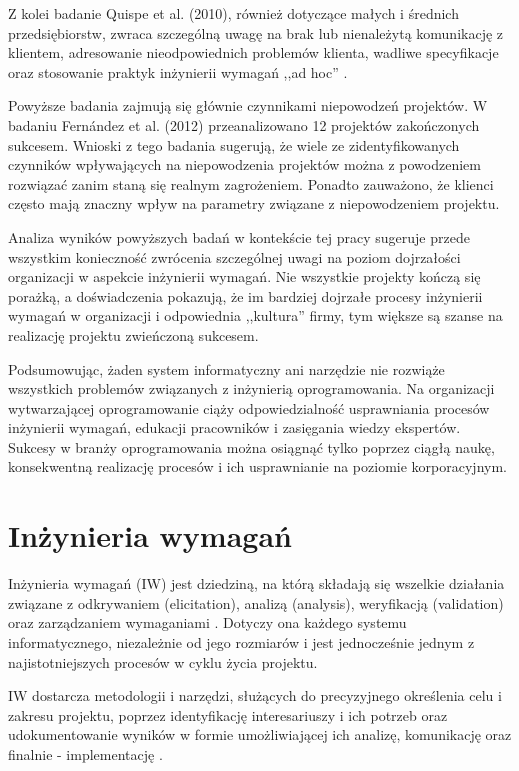     Z kolei badanie Quispe et al. (2010), również dotyczące małych i średnich przedsiębiorstw, zwraca szczególną uwagę na brak lub nienależytą komunikację z klientem, adresowanie nieodpowiednich problemów klienta, wadliwe specyfikacje oraz stosowanie praktyk inżynierii wymagań ,,ad hoc'' \cite{Quispe10}.
    
    Powyższe badania zajmują się głównie czynnikami niepowodzeń projektów. W badaniu Fern\'{a}ndez et al. (2012) przeanalizowano 12 projektów zakończonych sukcesem. Wnioski z tego badania sugerują, że wiele ze zidentyfikowanych czynników wpływających na niepowodzenia projektów można z powodzeniem rozwiązać zanim staną się realnym zagrożeniem. Ponadto zauważono, że klienci często mają znaczny wpływ na parametry związane z niepowodzeniem projektu. 

    Analiza wyników powyższych badań w kontekście tej pracy sugeruje przede wszystkim konieczność zwrócenia szczególnej uwagi na poziom dojrzałości organizacji w aspekcie inżynierii wymagań. Nie wszystkie projekty kończą się porażką, a doświadczenia pokazują, że im bardziej dojrzałe procesy inżynierii wymagań w organizacji i odpowiednia ,,kultura'' firmy, tym większe są szanse na realizację projektu zwieńczoną sukcesem. 

    Podsumowując, żaden system informatyczny ani narzędzie nie rozwiąże wszystkich problemów związanych z inżynierią oprogramowania. Na organizacji wytwarzającej oprogramowanie ciąży odpowiedzialność usprawniania procesów inżynierii wymagań, edukacji pracowników i zasięgania wiedzy ekspertów. Sukcesy w branży oprogramowania można osiągnąć tylko poprzez ciągłą naukę, konsekwentną realizację procesów i ich usprawnianie na poziomie korporacyjnym.

  \section{Inżynieria wymagań}
    
    Inżynieria wymagań (IW) jest dziedziną, na którą składają się wszelkie działania związane z odkrywaniem (elicitation), analizą (analysis), weryfikacją (validation) oraz zarządzaniem wymaganiami \cite{Somm06}. Dotyczy ona każdego systemu informatycznego, niezależnie od jego rozmiarów i jest jednocześnie jednym z najistotniejszych procesów w cyklu życia projektu.

    IW dostarcza metodologii i narzędzi, służących do precyzyjnego określenia celu i zakresu projektu, poprzez identyfikację interesariuszy i ich potrzeb oraz udokumentowanie wyników w formie umożliwiającej ich analizę, komunikację oraz finalnie - implementację \cite{Nus00}. 

